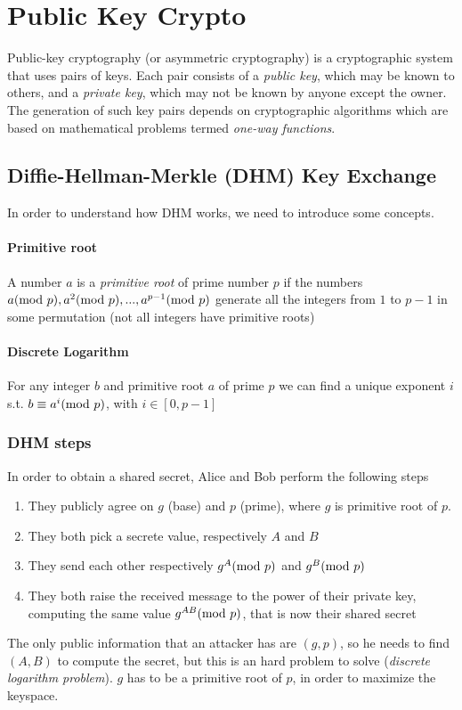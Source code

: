 \section{Public Key Crypto}
Public-key cryptography (or asymmetric cryptography) is a cryptographic system that uses pairs of keys. Each pair consists of a \textit{public key}, which may be known to others, and a \textit{private key}, which may not be known by anyone except the owner. The generation of such key pairs depends on cryptographic algorithms which are based on mathematical problems termed \textit{one-way functions}.

\subsection{Diffie-Hellman-Merkle (DHM) Key Exchange}
In order to understand how DHM works, we need to introduce some concepts.
\paragraph{Primitive root} A number $a$ is a \textit{primitive root} of prime number $p$ if the numbers $a(\mathrm{mod}\ p),a^2(\mathrm{mod}\ p),...,a^{p-1}(\mathrm{mod}\ p)$ generate all the integers from $1$ to $p-1$ in some permutation (not all integers have primitive roots)

\paragraph{Discrete Logarithm} For any integer $b$ and primitive root $a$ of prime $p$ we can find a unique exponent $i$ s.t. $b\equiv a^i (\mathrm{mod}\ p)$, with $i\in[0,p-1]$

\subsubsection{DHM steps}
In order to obtain a shared secret, Alice and Bob perform the following steps
\begin{enumerate}
    \item They publicly agree on $g$ (base) and $p$ (prime), where $g$ is primitive root of $p$.
    \item They both pick a secrete value, respectively $A$ and $B$
    \item They send each other respectively $g^A(\mathrm{mod}\ p)$ and $g^B(\mathrm{mod}\ p)$
    \item They both raise the received message to the power of their private key, computing the same value $g^{AB}(\mathrm{mod}\ p)$, that is now their shared secret
\end{enumerate}
The only public information that an attacker has are $(g,p)$, so he needs to find $(A,B)$ to compute the secret, but this is an hard problem to solve (\textit{discrete logarithm problem}). $g$ has to be a primitive root of $p$, in order to maximize the keyspace.
